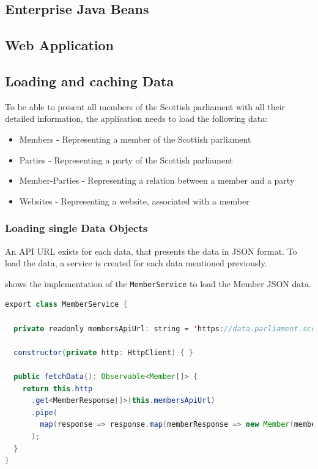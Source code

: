\subsection{Enterprise Java Beans}

\subsection{Web Application}



\subsection{Loading and caching Data}\label{subsec:02_impl_data}
To be able to present all members of the Scottish parliament with all their detailed information, the application needs to load the following data:
\begin{itemize}
\item Members - Representing a member of the Scottish parliament
\item Parties - Representing a party of the Scottish parliament
\item Member-Parties - Representing a relation between a member and a party
\item Websites - Representing a website, associated with a member
\end{itemize}


\subsubsection{Loading single Data Objects}\label{subsubsec:02_impl_data_loading}
An API URL exists for each data, that presents the data in JSON format. To load the data, a service is created for each data mentioned previously.

 shows the implementation of the \texttt{MemberService} to load the Member JSON data.
\begin{lstlisting}[label=lst:02_impl_data_memberservice, caption=\texttt{MemberService} implementation, language=java]
export class MemberService {

  private readonly membersApiUrl: string = 'https://data.parliament.scot/api/members';

  constructor(private http: HttpClient) { }

  public fetchData(): Observable<Member[]> {
    return this.http
      .get<MemberResponse[]>(this.membersApiUrl)
      .pipe(
        map(response => response.map(memberResponse => new Member(memberResponse)))
      );
  }
}
\end{lstlisting}

